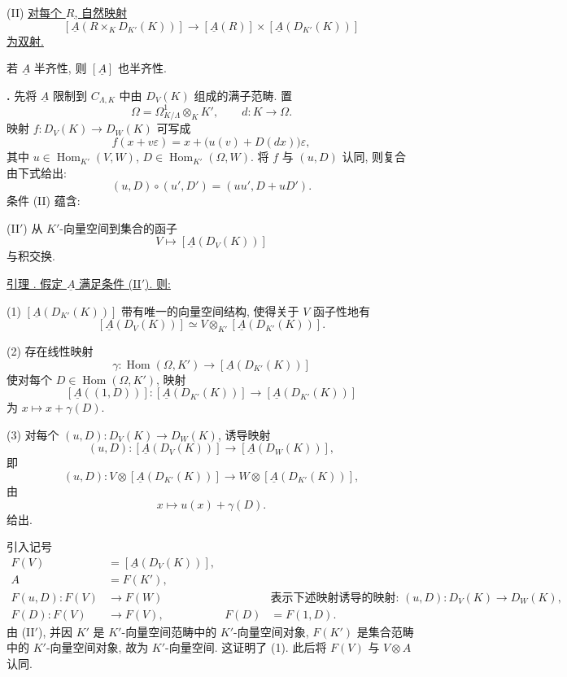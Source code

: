 (II) \underline{对每个 $R$, 自然映射}
\[
 [\underline A(R\times_KD_{K'}(K))]
 \longrightarrow
 [\underline A(R)]\times[\underline A(D_{K'}(K))]
\]
\underline{为双射.}

若 $\underline A$ 半齐性, 则 $[\underline A]$ 也半齐性.

\textbf{.}
先将 $\underline A$ 限制到 $C_{\Lambda,K}$ 中由 $D_V(K)$ 组成的满子范畴.
置
\[
 \Omega=\Omega^1_{K/\Lambda}\otimes_KK',
 \qquad d:K\longrightarrow\Omega.
\]
映射 $f:D_V(K)\longrightarrow D_W(K)$ 可写成
\[
 f(x+v\varepsilon)
 =x+\bigl(u(v)+D(dx)\bigr)\varepsilon,
\]
其中 $u\in\operatorname{Hom}_{K'}(V,W)$,
$D\in\operatorname{Hom}_{K'}(\Omega,W)$.
将 $f$ 与 $(u,D)$ 认同, 则复合由下式给出:
\[
 (u,D)\circ(u',D')=(uu',D+uD').
\]
条件 (II) 蕴含:

(II$'$) 从 $K'$-向量空间到集合的函子
\[
 V\longmapsto[\underline A(D_V(K))]
\]
与积交换.



\underline{引理 .
假定 $\underline A$ 满足条件 (II$'$). 则:}

(1) $[\underline A(D_{K'}(K))]$ 带有唯一的向量空间结构,
使得关于 $V$ 函子性地有
\[
 [\underline A(D_V(K))]
 \simeq
 V\otimes_{K'}[\underline A(D_{K'}(K))].
\]

(2) 存在线性映射
\[
 \gamma:\operatorname{Hom}(\Omega,K')
 \longrightarrow [\underline A(D_{K'}(K))]
\]
使对每个 $D\in\operatorname{Hom}(\Omega,K')$, 映射
\[
 [\underline A((1,D))]:
 [\underline A(D_{K'}(K))]
 \longrightarrow [\underline A(D_{K'}(K))]
\]
为 $x\longmapsto x+\gamma(D)$.

(3) 对每个 $(u,D):D_V(K)\longrightarrow D_W(K)$, 诱导映射
\[
 (u,D):[\underline A(D_V(K))]
 \longrightarrow[\underline A(D_W(K))],
\]
即
\[
 (u,D):
 V\otimes[\underline A(D_{K'}(K))]
 \longrightarrow
 W\otimes[\underline A(D_{K'}(K))],
\]
由
\[
 x\longmapsto u(x)+\gamma(D).
\]
给出.

引入记号
\[
\begin{aligned}
 F(V)&=[\underline A(D_V(K))],\\
 A&=F(K'),\\
 F(u,D):F(V)&\longrightarrow F(W)
   &&\text{表示下述映射诱导的映射: }
     (u,D):D_V(K)\longrightarrow D_W(K),\\
 F(D):F(V)&\longrightarrow F(V),
   &F(D)&=F(1,D).
\end{aligned}
\]
由 (II$'$), 并因 $K'$ 是 $K'$-向量空间范畴中的 $K'$-向量空间对象,
$F(K')$ 是集合范畴中的 $K'$-向量空间对象, 故为 $K'$-向量空间.
这证明了 (1). 此后将 $F(V)$ 与 $V\otimes A$ 认同.

